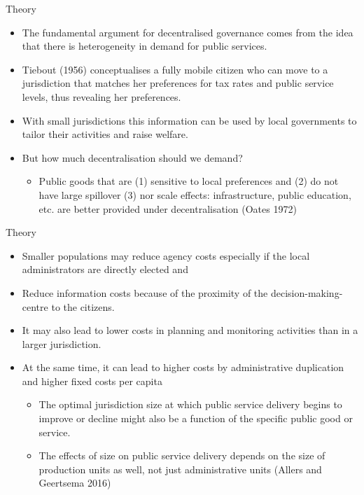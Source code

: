 \documentclass{beamer}
\begin{document}
		\begin{frame}{Theory}
			\begin{itemize}
				\item The fundamental argument for decentralised governance comes from the idea that there is heterogeneity in demand for public services.
				\item Tiebout (1956) conceptualises a fully mobile citizen who can move to a jurisdiction that matches her preferences for tax rates and public service levels, thus revealing her preferences. 
				\item With small jurisdictions this information can be used by local governments to tailor their activities and raise welfare. 
				\item But how much decentralisation should we demand?
				\begin{itemize}
					\item Public goods that are (1) sensitive to local preferences and (2) do not have large spillover (3) nor scale effects: infrastructure, public education, etc. are better provided under decentralisation (Oates 1972)
				\end{itemize}
			\end{itemize}
		\end{frame}
		
		\begin{frame}{Theory}
			\begin{itemize}
				\item Smaller populations may reduce agency costs especially if the local administrators are directly elected and 
				\item Reduce information costs because of the proximity of the decision-making-centre to the citizens. 
				\item It may also lead to lower costs in planning and monitoring activities than in a larger jurisdiction. 
				\item At the same time, it can lead to higher costs by administrative duplication and higher fixed costs per capita
				\begin{itemize}
					\item The optimal jurisdiction size at which public service delivery begins to improve or decline might also be a function of the specific public good or service. 
					\item The effects of size on public service delivery depends on the size of production units as well, not just administrative units (Allers and Geertsema 2016)
				\end{itemize} 
			\end{itemize}
		\end{frame}
		
\end{document}

